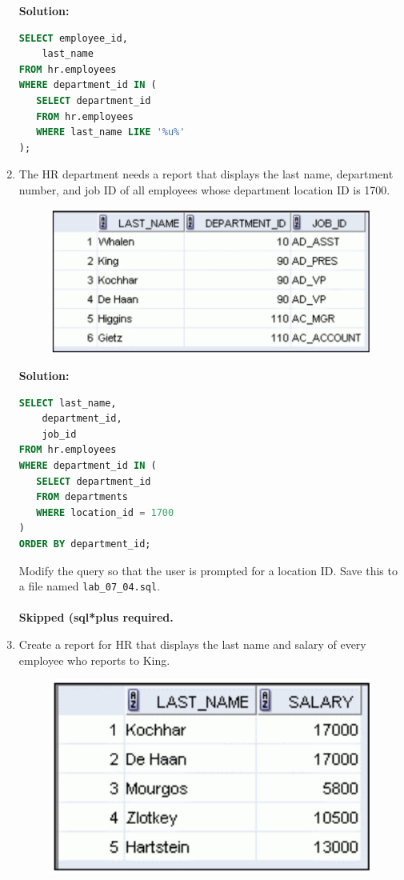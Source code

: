\documentclass[a4paper,12pt]{article}
\begin{document}
\begin{enumerate}
    \textbf{Solution: }
    \begin{lstlisting}[language=SQL]
SELECT employee_id,
    last_name
FROM hr.employees
WHERE department_id IN (
   SELECT department_id
   FROM hr.employees
   WHERE last_name LIKE '%u%'
);
    \end{lstlisting}
        \item The HR department needs a report that displays the last name, department number, and job ID
of all employees whose department location ID is 1700.
    \begin{figure}[h]
        \centering
            \centering
            \includegraphics[width=.7\linewidth]{graphics/74.png}
    \end{figure}
    \newpage
    \textbf{Solution: }
    \begin{lstlisting}[language=SQL]
SELECT last_name,
    department_id,
    job_id
FROM hr.employees
WHERE department_id IN (
   SELECT department_id
   FROM departments
   WHERE location_id = 1700
)
ORDER BY department_id;
    \end{lstlisting}
    Modify the query so that the user is prompted for a location ID. Save this to a file named
\texttt{lab\_07\_04.sql}.\\ \\
\textbf{Skipped (sql*plus required.}
        \item Create a report for HR that displays the last name and salary of every employee who reports to
King.
    
    \begin{figure}[h]
        \centering
            \centering
            \includegraphics[width=.5\linewidth]{graphics/75.png}
    \end{figure}


\end{enumerate}
\end{document}
